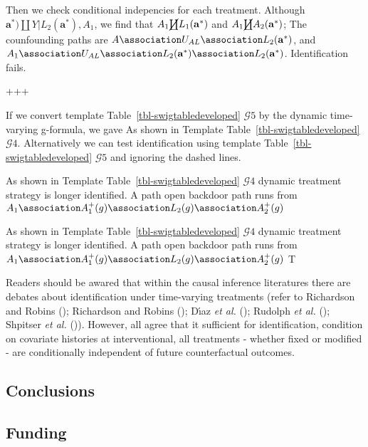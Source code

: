 \documentclass[
  single column]{article}
\begin{document}
Then we check conditional indepencies for each treatment. Although
\(\mathbf{a^*}) \coprod Y | L_2(\mathbf{a^*}), A_1\), we find that
\(A_1 \cancel \coprod L_1(\mathbf{a^*})\) and
\(A_1 \cancel \coprod A_2(\mathbf{a}^*)\); The counfounding paths are
\(A \association U_{AL} \association  L_2(\mathbf{a^*})\), and
\(A_1 \association U_{AL} \association  L_2(\mathbf{a^*}) \association  L_2(\mathbf{a^*})\).
Identification fails.

+++

If we convert template Table~\ref{tbl-swigtabledeveloped}
\(\mathcal{G}5\) by the dynamic time-varying g-formula, we gave As shown
in Template Table~\ref{tbl-swigtabledeveloped} \(\mathcal{G}4\).
Alternatively we can test identification using template
Table~\ref{tbl-swigtabledeveloped} \(\mathcal{G}5\) and ignoring the
dashed lines.

As shown in Template Table~\ref{tbl-swigtabledeveloped} \(\mathcal{G}4\)
dynamic treatment strategy is longer identified. A path open backdoor
path runs from
\(A_1 \association A^{+}_1(g) \association L_2(g) \association A^{+}_2(g)\)

As shown in Template Table~\ref{tbl-swigtabledeveloped} \(\mathcal{G}4\)
dynamic treatment strategy is longer identified. A path open backdoor
path runs from
\(A_1 \association A^{+}_1(g) \association L_2(g) \association A^{+}_2(g)\)
T

Readers should be awared that within the causal inference literatures
there are debates about identification under time-varying treatments
(refer to Richardson and Robins
(); Richardson and Robins
(); Dı́az \emph{et al.}
(); Rudolph \emph{et al.}
(); Shpitser \emph{et al.}
()). However, all agree
that it sufficient for identification, condition on covariate histories
at interventional, all treatments - whether fixed or modified - are
conditionally independent of future counterfactual outcomes.

\subsection{Conclusions}\label{conclusions}

\subsection{Funding}\label{funding}
\end{document}
